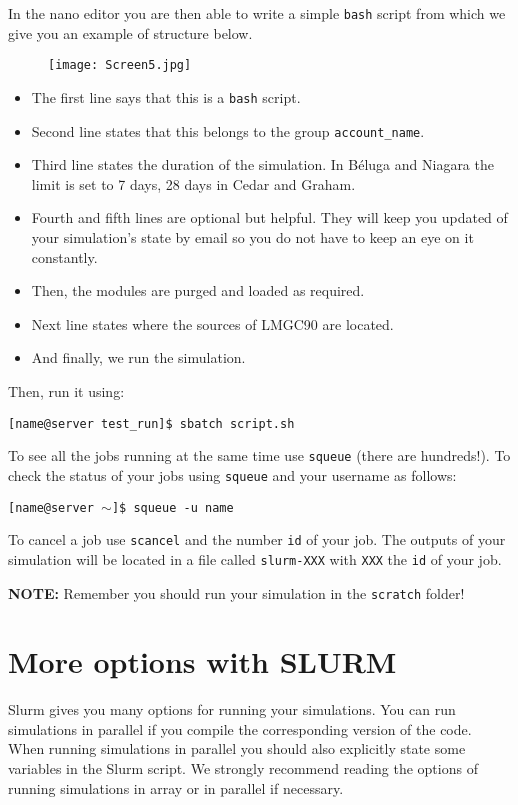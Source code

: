 \documentclass[12pt]{article}
\begin{document}
In the nano editor you are then able to write a simple \texttt{bash} script from which we give you an example of structure below.
\begin{figure}[H]
  \centering
  \texttt{[image: Screen5.jpg]}
\end{figure}
\begin{itemize}
    \item The first line says that this is a \texttt{bash} script.
    \item Second line states that this belongs to the group \texttt{account\_name}.
    \item Third line states the duration of the simulation. In Béluga and Niagara the limit is set to 7 days, 28 days in Cedar and Graham.
    \item Fourth and fifth lines are optional but helpful. They will keep you updated of your simulation’s state by email so you do not have to keep an eye on it constantly.
    \item Then, the modules are purged and loaded as required.
    \item Next line states where the sources of LMGC90 are located.
    \item And finally, we run the simulation.
\end{itemize} 

Then, run it using:
\begin{tcolorbox}
\texttt{[name@server test\_run]\$ sbatch script.sh}
\end{tcolorbox}

To see all the jobs running at the same time use \texttt{squeue} (there are hundreds!).
To check the status of your jobs using \texttt{squeue} and your username as follows:
\begin{tcolorbox}
\texttt{[name@server $\sim$]\$ squeue -u name}
\end{tcolorbox}
To cancel a job use \texttt{scancel} and the number \texttt{id} of your job.
The outputs of your simulation will be located in a file called \texttt{slurm-XXX} with \texttt{XXX} the \texttt{id} of your job.

\textbf{NOTE:} Remember you should run your simulation in the \texttt{scratch} folder!


\section*{More options with SLURM}
Slurm gives you many options for running your simulations. You can run simulations in parallel if you compile the corresponding version of the code. When running simulations in parallel you should also explicitly state some variables in the Slurm script. We strongly recommend reading the options of running simulations in array or in parallel if necessary. 
\end{document}
